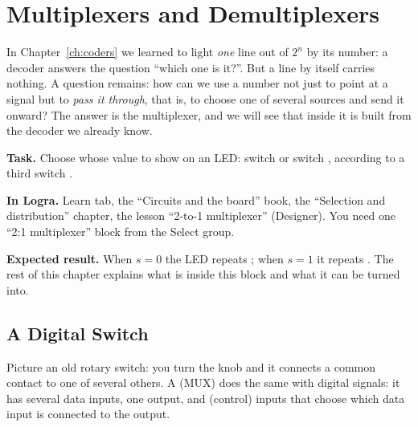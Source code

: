 \chapter{Multiplexers and Demultiplexers}
\label{ch:mux}

In Chapter~\ref{ch:coders} we learned to light \emph{one} line out of $2^n$ by
its number: a decoder answers the question ``which one is it?''. But a line by
itself carries nothing. A question remains: how can we use a number not just to
point at a signal but to \emph{pass it through}, that is, to choose one of
several sources and send it onward? The answer is the multiplexer, and we will
see that inside it is built from the decoder we already know.

\begin{buildbox}
\textbf{Task.} Choose whose value to show on an LED: switch  or switch
, according to a third switch .

\textbf{In Logra.} Learn tab, the ``Circuits and the board'' book, the
``Selection and distribution'' chapter, the lesson ``2-to-1 multiplexer''
(Designer). You need one ``2:1 multiplexer'' block from the Select group.

\textbf{Expected result.} When $s=0$ the LED repeats ; when $s=1$ it
repeats . The rest of this chapter explains what is inside this block
and what it can be turned into.
\end{buildbox}

\section{A Digital Switch}

Picture an old rotary switch: you turn the knob and it connects a common
contact to one of several others. A  (MUX) does the same with
digital signals: it has several data inputs, one output, and 
(control) inputs that choose which data input is connected to the output.


